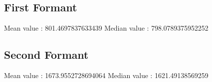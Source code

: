\documentclass{article}%
\begin{document}
%
\subsection{First Formant}%
\label{subsec:FirstFormant}%
Mean value : 801.4697837633439%
\newline%
Median value : 798.0789375952252

%
\subsection{Second Formant}%
\label{subsec:SecondFormant}%
Mean value : 1673.9552728694064%
\newline%
Median value : 1621.49138569259

%
\end{document}

